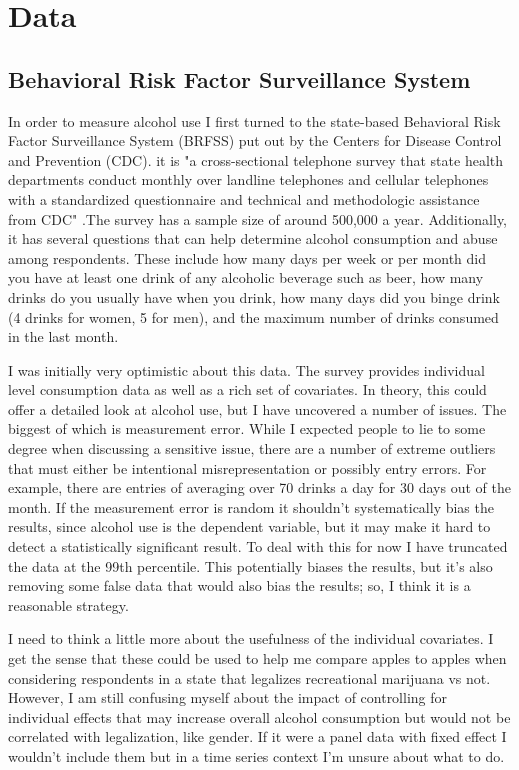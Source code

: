 \documentclass[11pt]{article}
\begin{document}
\section{Data}
\subsection{Behavioral Risk Factor Surveillance System}

In order to measure alcohol use I first turned to the state-based Behavioral Risk Factor Surveillance System (BRFSS) put out by the Centers for Disease Control and Prevention (CDC). it is "a cross-sectional telephone survey that state health departments conduct monthly over landline telephones and cellular telephones with a standardized questionnaire and technical and methodologic assistance from CDC" \cite{BRFSS_homepage}.The survey has a sample size of around 500,000 a year. Additionally, it has several questions that can help determine alcohol consumption and abuse among respondents. These include how many days per week or per month did you have at least one drink of any alcoholic beverage such as beer, how many drinks do you usually have when you drink, how many days did you binge drink (4 drinks for women, 5 for men), and the maximum number of drinks consumed in the last month. \par

I was initially very optimistic about this data. The survey provides individual level consumption data as well as a rich set of covariates. In theory, this could offer a detailed look at alcohol use, but I have uncovered a number of issues. The biggest of which is measurement error. While I expected people to lie to some degree when discussing a sensitive issue, there are a number of extreme outliers that must either be intentional misrepresentation or possibly entry errors. For example, there are entries of averaging over 70 drinks a day for 30 days out of the month. If the measurement error is random it shouldn't systematically bias the results, since alcohol use is the dependent variable, but it may make it hard to detect a statistically significant result. To deal with this for now I have truncated the data at the 99th percentile. This potentially biases the results, but it's also removing some false data that would also bias the results; so, I think it is a reasonable strategy.  \par

I need to think a little more about the usefulness of the individual covariates. I get the sense that these could be used to help me compare apples to apples when considering respondents in a state that legalizes recreational marijuana vs not. However, I am still confusing myself about the impact of controlling for individual effects that may increase overall alcohol consumption but would not be correlated with legalization, like gender. If it were a panel data with fixed effect I wouldn't include them but in a time series context I'm unsure about what to do. \par
\end{document}
